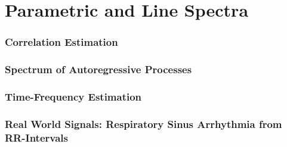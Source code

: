 \documentclass[main.tex]{subfiles}
\begin{document}
\section{Parametric and Line Spectra}

\subsubsection{Correlation Estimation}





\subsubsection{Spectrum of Autoregressive Processes}






\subsubsection{Time-Frequency Estimation}





\subsubsection{Real World Signals: Respiratory Sinus Arrhythmia from RR-Intervals}

\pagebreak
\end{document}
